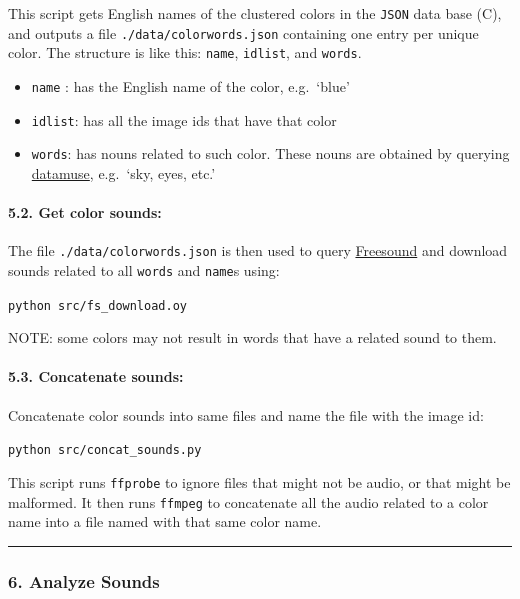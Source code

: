 This script gets English names of the clustered colors in the \texttt{JSON} data base (C), and outputs a file \texttt{./data/colorwords.json} containing one entry per unique color. The structure is like this: \texttt{name}, \texttt{idlist}, and \texttt{words}.

\begin{itemize}
\tightlist
\item
  \texttt{name} : has the English name of the color, e.g.~`blue'
\item
  \texttt{idlist}: has all the image ids that have that color
\item
  \texttt{words}: has nouns related to such color. These nouns are obtained by querying \href{https://datamuse.com}{datamuse}, e.g.~`sky, eyes, etc.'
\end{itemize}

\hypertarget{get-color-sounds}{%
\paragraph{5.2. Get color sounds:}\label{get-color-sounds}}

The file \texttt{./data/colorwords.json} is then used to query \href{https://freesound.org}{Freesound} and download sounds related to all \texttt{words} and \texttt{name}s using:

\texttt{python\ src/fs\_download.oy}

NOTE: some colors may not result in words that have a related sound to them.

\hypertarget{concatenate-sounds}{%
\paragraph{5.3. Concatenate sounds:}\label{concatenate-sounds}}

Concatenate color sounds into same files and name the file with the image id:

\texttt{python\ src/concat\_sounds.py}

This script runs \texttt{ffprobe} to ignore files that might not be audio, or that might be malformed. It then runs \texttt{ffmpeg} to concatenate all the audio related to a color name into a file named with that same color name.

\begin{center}\rule{0.5\linewidth}{\linethickness}\end{center}

\hypertarget{analyze-sounds}{%
\subsubsection{6. Analyze Sounds}\label{analyze-sounds}}

